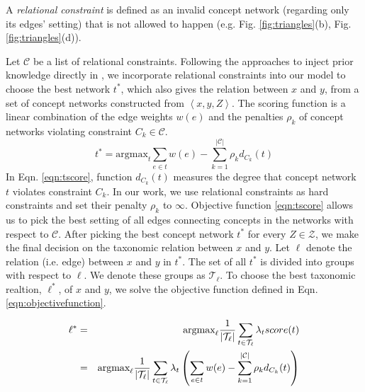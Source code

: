 A {\em relational constraint} is defined as an invalid concept network
(regarding only its edges' setting) that is not allowed to happen
(e.g. Fig. \ref{fig:triangles}(b),
Fig. \ref{fig:triangles}(d)). 

Let $\mathcal{C}$ be a list of relational constraints. Following the
approaches to inject prior knowledge directly in \cite{ChangRaRo08},
we incorporate relational constraints into our model to choose the
best network $t^*$, which also gives the relation between $x$ and $y$,
from a set of concept networks constructed from $\left < x, y, Z
\right >$. The scoring function is a linear combination of the edge
weights $w(e)$ and the penalties $\rho_k$ of concept networks
violating constraint $C_k \in \mathcal{C}$.
%
\begin{equation}
  \label{eqn:tscore}
  t^* = \text{argmax}_{t} \sum_{e \in t} w(e) - \sum_{k=1}^{|\mathcal{C}|} \rho_{k} d_{C_k}(t)
\end{equation}
%
In Eqn. \ref{eqn:tscore}, function $d_{C_k}(t)$ measures the degree
that concept network $t$ violates constraint $C_k$.  In our work, we
use relational constraints as hard constraints and set their penalty
$\rho_k$ to $\infty$. Objective function \ref{eqn:tscore} allows us to
pick the best setting of all edges connecting concepts in the networks
with respect to $\mathcal{C}$.
%
After picking the best concept network $t^*$ for every $Z \in
\mathcal{Z}$, we make the final decision on the taxonomic relation
between $x$ and $y$. Let $\ell$ denote the relation (i.e. edge) between $x$
and $y$ in $t^*$. The set of all $t^*$ is divided into
groups with respect to $\ell$. We denote these groups as
$\mathcal{T}_{\ell}$. To choose the best taxonomic realtion, $\ell^*$,
of $x$ and $y$, we solve the objective function defined in
Eqn. \ref{eqn:objectivefunction}.
%
%
{\small
\begin{eqnarray}
\label{eqn:objectivefunction}
\ell^* & = & \text{argmax}_{\ell} \frac {1} {|\mathcal{T}_{\ell}|} \sum_{t \in \mathcal{T}_{\ell}} \lambda_{t} score(t) \\
& = & \text{argmax}_{\ell} \frac{1}{|\mathcal{T}_{\ell}|} \sum_{t \in \mathcal{T}_{\ell}} \lambda_{t} \left( \sum_{e \in t} w(e) - \sum_{k=1}^{|\mathcal{C}|} \rho_{k} d_{C_k}(t) \right) \notag
\end{eqnarray}
}
